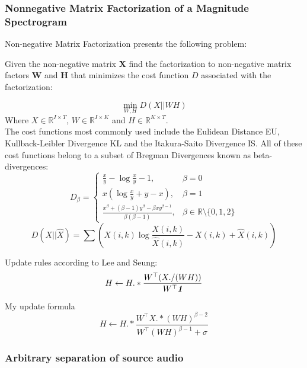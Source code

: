 \documentclass[10pt]{article}
\def\mathbi#1{\textbf{\em #1}}
\begin{document}
\subsubsection{Nonnegative Matrix Factorization of a Magnitude Spectrogram}
Non-negative Matrix Factorization presents the following problem:
\begin{center}
Given the non-negative matrix \textbf{X} find the factorization to non-negative matrix factors  \textbf{W} and \textbf{H} that minimizes the cost function $D$ associated with the factorization:
\end{center}
\begin{equation}
{\min_{W,H} D(X||WH)}
\end{equation}
Where $X\in \mathbb{R}^{I \times T}$, $W\in \mathbb{R}^{I \times K}$ and $H\in \mathbb{R}^{K \times T}$. 
\\
The cost functions most commonly used include the Eulidean Distance EU, Kullback-Leibler Divergence KL and the Itakura-Saito Divergence IS. All of these cost functions belong to a subset of Bregman Divergences known as beta-divergences:
\begin{equation}
D_\beta =     \left\{ \begin{array}{rcl}\frac{x}{y}-\log \frac{x}{y}-1, & \beta = 0 \\ 
x(\log \frac{x}{y}+y-x),  & \beta = 1
\\
\iffalse 
(x-y)^2, & \beta = 2
\\
\fi
\frac{x^\beta +(\beta -1)y^\beta -\beta xy^{\beta-1}}{\beta (\beta -1)}, & \beta \in \mathbb{R}\setminus \lbrace0,1,2\rbrace \end{array}\right.
\end{equation}
\begin{equation}
D(X||\hat{X})=\sum(X(i,k)\log \frac{X(i,k)}{\hat{X}(i,k)} -X(i,k)+\hat{X}(i,k))
\end{equation}

Update rules according to Lee and Seung:
\begin{equation}
H \leftarrow H.*\frac{W^\top (X./(WH))}{W^\top\mathbi{1}}
\end{equation}

My update formula
\begin{equation}
H \leftarrow H.*\frac{W^\top X.*(WH)^{\beta-2}}{W^\top (WH)^{\beta-1} +\sigma}
\end{equation}
\subsubsection{Arbitrary separation of source audio}
\end{document}
